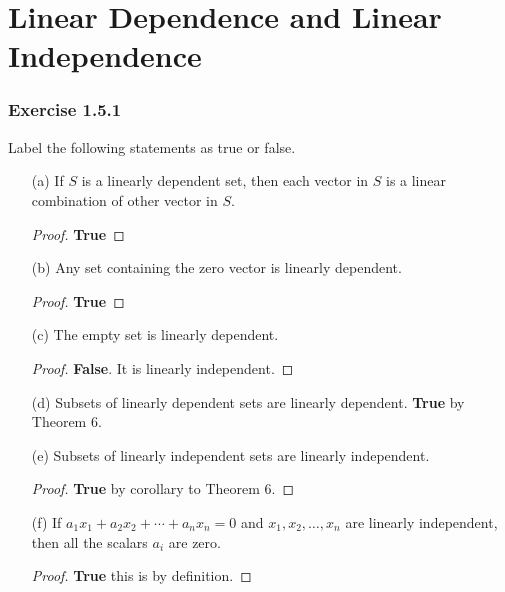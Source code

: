 \section{Linear Dependence and Linear Independence}

\subsubsection{Exercise 1.5.1} Label the following statements as true or false.

\begin{enumerate}
    \item[(a)] If \( S  \) is a linearly dependent set, then each vector in \( S  \) is a linear combination of other vector in \( S  \).
        \begin{proof}
        \textbf{True}
        \end{proof}
    \item[(b)] Any set containing the zero vector is linearly dependent.
        \begin{proof}
        \textbf{True}
        \end{proof}
    \item[(c)] The empty set is linearly dependent.
        \begin{proof}
        \textbf{False}. It is linearly independent.
        \end{proof}
    \item[(d)] Subsets of linearly dependent sets are linearly dependent. 
        \textbf{True} by Theorem 6.
    \item[(e)] Subsets of linearly independent sets are linearly independent.
        \begin{proof}
        \textbf{True} by corollary to Theorem 6.
        \end{proof}
    \item[(f)] If \( a_{1} x_{1} + a_{2} x_{2} + \cdots + a_{n} x_{n} = 0  \) and \( x_{1}, x_{2}, \dots, x_{n}  \) are linearly independent, then all the scalars \( a_{i}  \) are zero.
        \begin{proof}
       \textbf{True} this is by definition. 
        \end{proof}
\end{enumerate}

